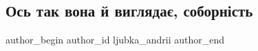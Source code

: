  
 
 
 
 
 
\subsection{Ось так вона й виглядає, соборність}
\label{sec:22_02_2022.stz.news.ua.zbruc.1.sobornist}
 
\ifcmt
 author_begin
   author_id ljubka_andrii
 author_end
\fi
